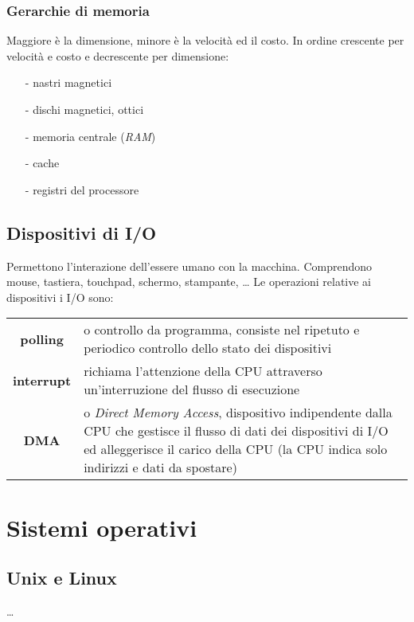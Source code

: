 \documentclass{article}
\begin{document}
\subsubsection*{Gerarchie di memoria}
Maggiore è la dimensione, minore è la velocità ed il costo. In ordine crescente per velocità e costo e decrescente per dimensione:
\begin{itemize}[topsep=3pt, itemsep=0pt]
	\item[-] nastri magnetici
	\item[-] dischi magnetici, ottici
	\item[-] memoria centrale (\textit{RAM})
	\item[-] cache
	\item[-] registri del processore
\end{itemize}

\subsection{Dispositivi di I/O}
Permettono l'interazione dell'essere umano con la macchina. Comprendono mouse, tastiera, touchpad, schermo, stampante, \dots
Le operazioni relative ai dispositivi i I/O sono:
\begin{center}
	\begin{tabularx}{\textwidth}{c X}
		\textbf{polling} & o controllo da programma, consiste nel ripetuto e periodico controllo dello stato dei dispositivi \\
		\textbf{interrupt} & richiama l'attenzione della CPU attraverso un'interruzione del flusso di esecuzione \\
		\textbf{DMA} & o \textit{Direct Memory Access}, dispositivo indipendente dalla CPU che gestisce il flusso di dati dei
		dispositivi di I/O ed alleggerisce il carico della CPU (la CPU indica solo indirizzi e dati da spostare)
	\end{tabularx}
\end{center}

\newpage

\section{Sistemi operativi}
\subsection{Unix e Linux}
\dots
\end{document}
